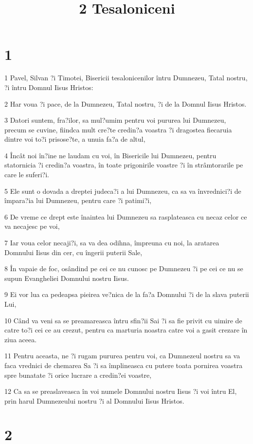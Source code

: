 

\title{2 Tesaloniceni}


\chapter{1}

\par 1 Pavel, Silvan ?i Timotei, Bisericii tesalonicenilor întru Dumnezeu, Tatal nostru, ?i întru Domnul Iisus Hristos:
\par 2 Har voua ?i pace, de la Dumnezeu, Tatal nostru, ?i de la Domnul Iisus Hristos.
\par 3 Datori suntem, fra?ilor, sa mul?umim pentru voi pururea lui Dumnezeu, precum se cuvine, fiindca mult cre?te credin?a voastra ?i dragostea fiecaruia dintre voi to?i prisose?te, a unuia fa?a de altul,
\par 4 Încât noi în?ine ne laudam cu voi, în Bisericile lui Dumnezeu, pentru statornicia ?i credin?a voastra, în toate prigonirile voastre ?i în strâmtorarile pe care le suferi?i.
\par 5 Ele sunt o dovada a dreptei judeca?i a lui Dumnezeu, ca sa va învrednici?i de împara?ia lui Dumnezeu, pentru care ?i patimi?i,
\par 6 De vreme ce drept este înaintea lui Dumnezeu sa rasplateasca cu necaz celor ce va necajesc pe voi,
\par 7 Iar voua celor necaji?i, sa va dea odihna, împreuna cu noi, la aratarea Domnului Iisus din cer, cu îngerii puterii Sale,
\par 8 În vapaie de foc, osândind pe cei ce nu cunosc pe Dumnezeu ?i pe cei ce nu se supun Evangheliei Domnului nostru Iisus.
\par 9 Ei vor lua ca pedeapsa pieirea ve?nica de la fa?a Domnului ?i de la slava puterii Lui,
\par 10 Când va veni sa se preamareasca întru sfin?ii Sai ?i sa fie privit cu uimire de catre to?i cei ce au crezut, pentru ca marturia noastra catre voi a gasit crezare în ziua aceea.
\par 11 Pentru aceasta, ne ?i rugam pururea pentru voi, ca Dumnezeul nostru sa va faca vrednici de chemarea Sa ?i sa împlineasca cu putere toata pornirea voastra spre bunatate ?i orice lucrare a credin?ei voastre,
\par 12 Ca sa se preaslaveasca în voi numele Domnului nostru Iisus ?i voi întru El, prin harul Dumnezeului nostru ?i al Domnului Iisus Hristos.

\chapter{2}

